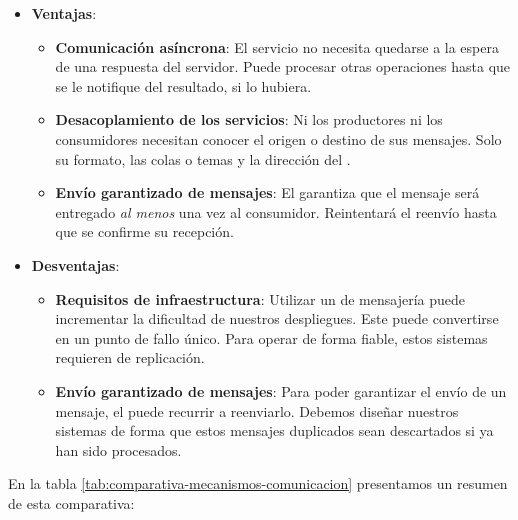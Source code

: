 \begin{itemize}
  \item \textbf{Ventajas}:

  \begin{itemize}
    \item \textbf{Comunicación asíncrona}: El servicio no necesita quedarse a la espera de una respuesta del servidor. Puede procesar otras operaciones hasta que se le notifique del resultado, si lo hubiera.

    \item \textbf{Desacoplamiento de los servicios}: Ni los productores ni los consumidores necesitan conocer el origen o destino de sus mensajes. Solo su formato, las colas o temas y la dirección del .

    \item \textbf{Envío garantizado de mensajes}: El  garantiza que el mensaje será entregado \emph{al menos} una vez al consumidor. Reintentará el reenvío hasta que se confirme su recepción.

  \end{itemize}

  \item \textbf{Desventajas}:

  \begin{itemize}
    \item \textbf{Requisitos de infraestructura}: Utilizar un  de mensajería puede incrementar la dificultad de nuestros despliegues. Este puede convertirse en un punto de fallo único. Para operar de forma fiable, estos sistemas requieren de replicación. \cite{newmanBuildingMicroservicesDesigning2021}

    \item \textbf{Envío garantizado de mensajes}: Para poder garantizar el envío de un mensaje, el  puede recurrir a reenviarlo. Debemos diseñar nuestros sistemas de forma que estos mensajes duplicados sean descartados si ya han sido procesados.
  \end{itemize}
\end{itemize}

En la tabla \ref{tab:comparativa-mecanismos-comunicacion} presentamos un resumen de esta comparativa:

